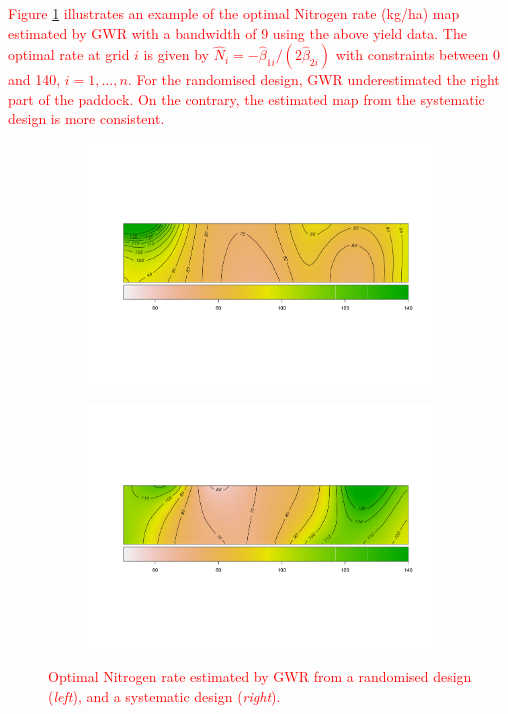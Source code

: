 \documentclass[a4paper]{article} 	%
\newcommand{\zc}[1]{\textcolor{red}{#1}}
\begin{document}
\zc{Figure \ref{fig:optNmap} illustrates an example of the optimal Nitrogen rate (kg/ha) map estimated by GWR with a bandwidth of 9 using the above yield data. The optimal rate at grid $i$ is given by $\hat{N}_i = -\hat{\beta}_{1i}/(2\hat{\beta}_{2i})$ with constraints between 0 and 140, $i=1,\ldots,n$. For the randomised design, GWR underestimated the right part of the paddock. On the contrary, the estimated map from the systematic design is more consistent.}

\begin{figure}[!htp]
	\begin{subfigure}[t]{0.45\textwidth}
		\centering
		\includegraphics[width=\linewidth]{optN_rand_matB9.pdf}
 \end{subfigure}
	\hspace{0.05\textwidth}
	\begin{subfigure}[t]{0.45\textwidth}
		\centering
		\includegraphics[width=\linewidth]{optN_syst_matB9.pdf}
 \end{subfigure}
	\caption{\zc{Optimal Nitrogen rate estimated by GWR from a randomised design (\textit{left}), and a systematic design (\textit{right}).}}\label{fig:optNmap}
\end{figure}
\end{document}
